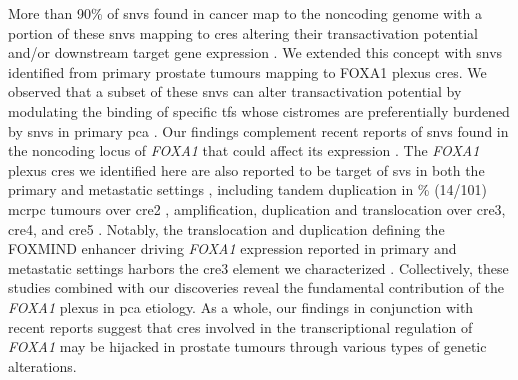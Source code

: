 More than 90\% of \glspl{snv} found in cancer map to the noncoding genome \cite{meltonRecurrentSomaticMutations2015,mazrooeiCistromePartitioningReveals2019} with a portion of these \glspl{snv} mapping to \glspl{cre} altering their transactivation potential \cite{baileyNoncodingSomaticInherited2016,zhangIntegrativeFunctionalGenomics2012,huangHighlyRecurrentTERT2013,hornTERTPromoterMutations2013} and/or downstream target gene expression \cite{zhouEmergenceNoncodingCancer2016,meltonRecurrentSomaticMutations2015,weinholdGenomewideAnalysisNoncoding2014}.
We extended this concept with \glspl{snv} identified from primary prostate tumours mapping to FOXA1 plexus \glspl{cre}.
We observed that a subset of these \glspl{snv} can alter transactivation potential by modulating the binding of specific \glspl{tf} whose cistromes are preferentially burdened by \glspl{snv} in primary \gls{pca} \cite{mazrooeiCistromePartitioningReveals2019}.
Our findings complement recent reports of \glspl{snv} found in the noncoding locus of \emph{FOXA1} that could affect its expression \cite{annalaFrequentMutationFOXA12018,camcapstudygroupSequencingProstateCancers2018}.
The \emph{FOXA1} plexus \glspl{cre} we identified here are also reported to be target of \glspl{sv} in both the primary and metastatic settings \cite{paroliaDistinctStructuralClasses2019,quigleyGenomicHallmarksStructural2018}, including tandem duplication in \% (14/101) \gls{mcrpc} tumours over \gls{cre}2 \cite{quigleyGenomicHallmarksStructural2018}, amplification, duplication and translocation over \gls{cre}3, \gls{cre}4, and \gls{cre}5 \cite{paroliaDistinctStructuralClasses2019}.
Notably, the translocation and duplication defining the FOXMIND enhancer driving \emph{FOXA1} expression reported in primary and metastatic settings harbors the \gls{cre}3 element we characterized \cite{paroliaDistinctStructuralClasses2019}.
Collectively, these studies combined with our discoveries reveal the fundamental contribution of the \emph{FOXA1} plexus in \gls{pca} etiology.
As a whole, our findings in conjunction with recent reports suggest that \glspl{cre} involved in the transcriptional regulation of \emph{FOXA1} may be hijacked in prostate tumours through various types of genetic alterations.

